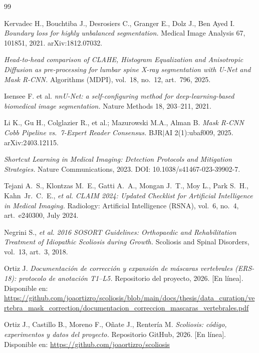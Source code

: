 \documentclass[conference]{IEEEtran}
\begin{document}
\begin{thebibliography}{99}

Kervadec H., Bouchtiba J., Desrosiers C., Granger E., Dolz J., Ben Ayed I.
\emph{Boundary loss for highly unbalanced segmentation.}
Medical Image Analysis 67, 101851, 2021. arXiv:1812.07032.

\emph{Head-to-head comparison of CLAHE, Histogram Equalization and Anisotropic Diffusion as pre-processing for lumbar spine X-ray segmentation with U-Net and Mask R-CNN.}
Algorithms (MDPI), vol.~18, no.~12, art.~796, 2025.

Isensee F. et al.
\emph{nnU-Net: a self-configuring method for deep-learning-based biomedical image segmentation.}
Nature Methods 18, 203--211, 2021.

Li K., Gu H., Colglazier R., et al.; Mazurowski M.A., Alman B.
\emph{Mask R-CNN Cobb Pipeline vs.~7-Expert Reader Consensus.}
BJR$|$AI 2(1):ubaf009, 2025. arXiv:2403.12115.

\emph{Shortcut Learning in Medical Imaging: Detection Protocols and Mitigation Strategies.}
Nature Communications, 2023. DOI: 10.1038/s41467-023-39902-7.

Tejani A.~S., Klontzas M.~E., Gatti A.~A., Mongan J.~T., Moy L., Park S.~H., Kahn~Jr.~C.~E., \emph{et al.}
\emph{CLAIM 2024: Updated Checklist for Artificial Intelligence in Medical Imaging.}
Radiology: Artificial Intelligence (RSNA), vol.~6, no.~4, art.~e240300, July 2024.

Negrini S., \emph{et al.}
\emph{2016 SOSORT Guidelines: Orthopaedic and Rehabilitation Treatment of Idiopathic Scoliosis during Growth.}
Scoliosis and Spinal Disorders, vol.~13, art.~3, 2018.

Ortiz J.
\emph{Documentación de corrección y expansión de máscaras vertebrales (ERS-18): protocolo de anotación T1--L5.}
Repositorio del proyecto, 2026. [En línea]. Disponible en: \url{https://github.com/joaortizro/scoliosis/blob/main/docs/thesis/data_curation/vertebra_mask_correction/documentacion_correccion_mascaras_vertebrales.pdf}

Ortiz J., Castillo B., Moreno F., Oñate J., Rentería M.
\emph{Scoliosis: código, experimentos y datos del proyecto.}
Repositorio GitHub, 2026. [En línea]. Disponible en: \url{https://github.com/joaortizro/scoliosis}

\end{thebibliography}
\end{document}
